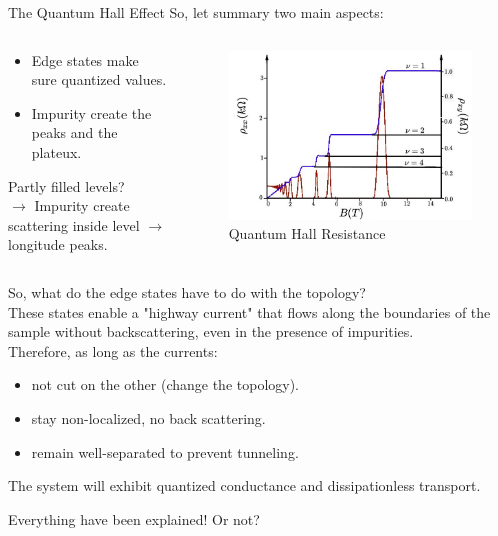 \documentclass{beamer}
\begin{document}
\begin{frame}{The Quantum Hall Effect}
	\quad So, let summary two main aspects:\null\\
	\begin{columns}
		\begin{column}{0.5\textwidth}
\begin{itemize}
\item Edge states make sure quantized values.\\ 
\item Impurity create the peaks and the plateux.\\
\end{itemize}
\quad Partly filled levels?\\
$\rightarrow$ Impurity create scattering inside level $\to$ longitude peaks.
		\end{column}
		\begin{column}{0.5\textwidth}
			\begin{figure}
				\includegraphics[width=0.8\linewidth]{Images/Rhoxy.jpg}
				\caption{Quantum Hall Resistance
					\cite*[Taken from ][]{manchesterAdvancedQuantum}}
			\end{figure}
		\end{column}
	\end{columns}
\end{frame}
\begin{frame}
So, what do the edge states have to do with the topology?\\\vspace{0.2cm}
These states enable a "highway current" that flows along the boundaries of the sample without backscattering, even in the presence of impurities.\\\vspace{0.2cm}
Therefore, as long as the currents:
\begin{itemize}
\item  not cut on the other (change the topology).
\item stay non-localized, no back scattering.
\item remain well-separated to prevent tunneling.
\end{itemize}
The system will exhibit quantized conductance and dissipationless transport.
\begin{center}
	Everything have been explained! Or not?
\end{center}
\end{frame}
\end{document}

